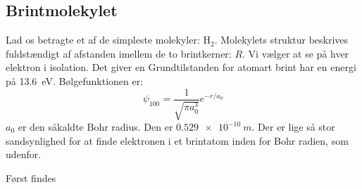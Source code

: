 \documentclass[../../Atom-ogMolekylefysik.tex]{subfiles}
\begin{document}
\subsection{Brintmolekylet}
Lad os betragte et af de simpleste molekyler: H$_2$.
Molekylets struktur beskrives fuldstændigt af afstanden imellem de to brintkerner: $R$. Vi vælger at se på hver elektron i isolation. Det giver en 
Grundtilstanden for atomart brint har en energi på \SI{13.6}{eV}. Bølgefunktionen er:
\begin{equation}
    \psi_{100} = \frac{1}{\sqrt{\pi a_0^3}}e^{-r/a_0}
\end{equation}
$a_0$ er den såkaldte Bohr radius. Den er $\SI{0.529e-10}{m}$. Der er lige så stor sandsynlighed for at finde elektronen i et brintatom inden for Bohr radien, som udenfor.

Først findes 
\end{document}
